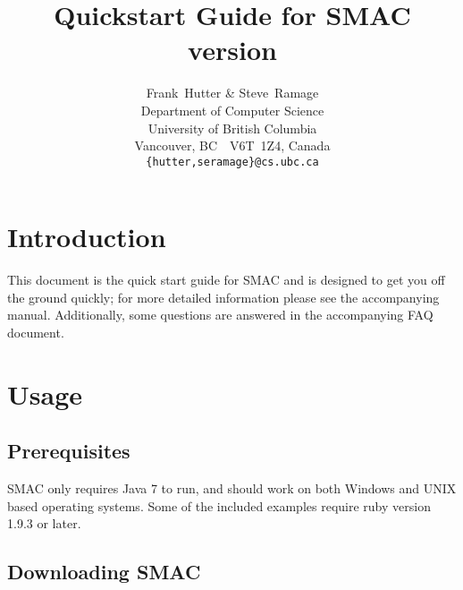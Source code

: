\documentclass[11pt,letterpaper,twoside]{article}
\begin{document}
\title{Quickstart Guide for SMAC version  }

\author{
Frank~Hutter \& Steve~Ramage\\
Department of Computer Science\\
University of British Columbia\\
Vancouver, BC\ \ V6T~1Z4, Canada\\
\texttt{\{hutter,seramage\}@cs.ubc.ca}
}

%
\newcommand{\version}{}
\maketitle

\section{Introduction}

This document is the quick start guide for SMAC \cite{HutHooLey11-SMAC} and is designed to get you off the ground quickly; for more detailed information please see the accompanying manual. Additionally, some questions are answered in the accompanying FAQ document.


\section {Usage}

\subsection{Prerequisites}


SMAC only requires Java 7 to run, and should work on both Windows and UNIX based operating systems. Some of the included examples require ruby version 1.9.3 or later.

\subsection{Downloading SMAC}
\end{document}
